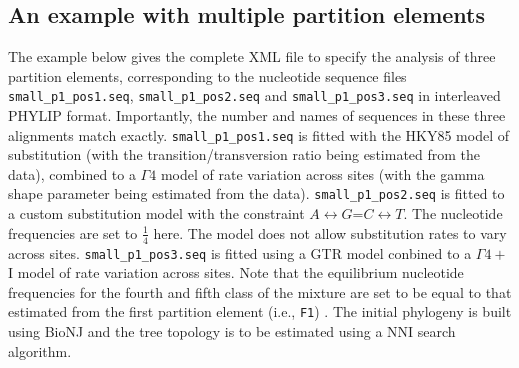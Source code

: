\documentclass[a4paper,12pt]{article}
\newcommand{\x}[1]{\texttt{#1}}
\begin{document}
\subsection{An example with multiple partition elements}

The example below gives  the complete XML file to specify the analysis  of three partition elements,
corresponding to the nucleotide  sequence files \x{small\_p1\_pos1.seq}, \x{small\_p1\_pos2.seq} and
\x{small\_p1\_pos3.seq} in  interleaved PHYLIP  format. Importantly, the number and names of
sequences in these three alignments match exactly. \x{small\_p1\_pos1.seq}  is fitted  with the
HKY85 model of substitution (with the  transition/transversion ratio being estimated from the data),
combined to a $\Gamma4$  model of rate variation across sites (with the  gamma shape parameter being
estimated from the data).  \x{small\_p1\_pos2.seq} is fitted to a custom substitution model with the
constraint  $A\leftrightarrow  G$=$C\leftrightarrow  T$.  The  nucleotide  frequencies  are  set  to
$\frac{1}{4}$   here.    The   model   does   not  allow   substitution   rates   to   vary   across
sites. \x{small\_p1\_pos3.seq} is fitted  using a GTR model conbined to a  $\Gamma4+$I model of rate
variation across sites.  Note that the equilibrium  nucleotide frequencies for the  fourth and fifth
class of the mixture are  set to be equal to that estimated from  the first partition element (i.e.,
\x{F1}) . The initial phylogeny is built using BioNJ  and the tree topology is to be estimated using
a NNI search algorithm.
\end{document}
